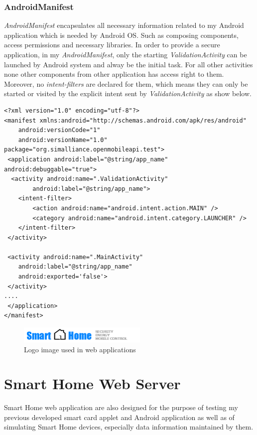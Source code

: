 \subsubsection{AndroidManifest}
\emph{AndroidManifest} encapsulates all necessary information related to my Android application which is needed by Android OS. Such as composing components, access permissions and necessary libraries\cite{android_manifest}. In order to provide a secure application, in my \emph{AndroidManifest}, only the starting \emph{ValidationActivity} can be launched by Android system and alway be the initial task. For all other activities none other components from other application has access right to them. Moreover, no \emph{intent-filters} are declared for them, which means they can only be started or visited by the explicit intent sent by \emph{ValidationActivity} as show below.
\begin{Verbatim}[fontsize=\relsize{-1},frame=lines,framesep=4mm, label=\fbox{\small\emph{AndroidManifest.xml}}]
<?xml version="1.0" encoding="utf-8"?>
<manifest xmlns:android="http://schemas.android.com/apk/res/android"
	android:versionCode="1"
	android:versionName="1.0" package="org.simalliance.openmobileapi.test">
 <application android:label="@string/app_name" android:debuggable="true">
  <activity android:name=".ValidationActivity"
 		android:label="@string/app_name">
	<intent-filter>
		<action android:name="android.intent.action.MAIN" />
		<category android:name="android.intent.category.LAUNCHER" />
	</intent-filter>
 </activity>
      
 <activity android:name=".MainActivity"
	android:label="@string/app_name"
	android:exported='false'>
 </activity>
....
 </application>
</manifest> 
\end{Verbatim}



\begin{figure}[!htb]
	\centering
	\includegraphics[width=0.55\textwidth]{logo.png}
		\caption{Logo image used in web applications}
	\label{fig:logo}
\end{figure}

\section{Smart Home Web Server}
Smart Home web application are also designed for the purpose of testing my previous developed smart card applet and Android application as well as of simulating Smart Home devices, especially data information maintained by them. 

